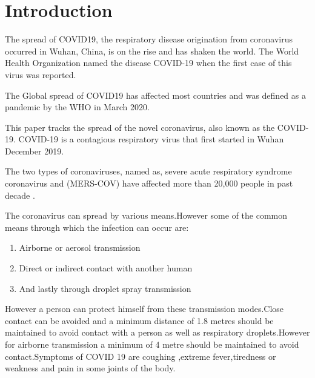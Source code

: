 \section{Introduction}

The spread of COVID19, the respiratory disease origination from coronavirus
occurred in Wuhan, China, is on the rise and has shaken the world. The World
Health Organization named the disease COVID-19 when the first case of this
virus was reported.

The Global spread of COVID19 has affected most countries and was defined as a
pandemic by the WHO in March 2020.

This paper tracks the spread of the novel coronavirus, also known as the
COVID-19. COVID-19 is a contagious respiratory virus that first started in
Wuhan December 2019. \cite{data_world}

The two types of coronaviruses, named as, severe acute respiratory syndrome
coronavirus and (MERS-COV) have affected more than
20,000 people in past decade \cite{huang2020clinical}.

The coronavirus can spread by various means.However some of the common means through which the infection can occur are:

\pagebreak

\begin{enumerate}
	\item Airborne or aerosol transmission
	\item Direct or indirect contact with another human
	\item And lastly through droplet spray transmission
\end{enumerate}
However a person can protect himself from these transmission modes.Close contact can be avoided and a minimum distance of 1.8 metres should be maintained to avoid contact with a person as well as respiratory droplets.However for airborne transmission a minimum of 4 metre should be maintained to avoid contact.Symptoms of COVID 19 are coughing ,extreme fever,tiredness or weakness and pain in some joints of the body.

